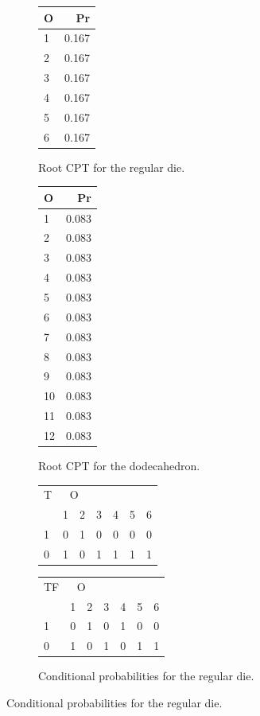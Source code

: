 \documentclass[
  10pt,
]{scrartcl}
\begin{document}
\begin{figure}[H]
\hspace{0.2cm}\begin{subfigure}[!ht]{0.25\textwidth}

\begin{tabular}{lr}
\toprule
O & Pr\\
\midrule
1 & 0.167\\
2 & 0.167\\
3 & 0.167\\
4 & 0.167\\
5 & 0.167\\
6 & 0.167\\
\bottomrule
\end{tabular}
\caption{Root CPT for the regular die.}
\end{subfigure} 
\hspace{0.2cm} \begin{subfigure}[!ht]{0.25\textwidth}

\begin{tabular}{lr}
\toprule
O & Pr\\
\midrule
1 & 0.083\\
2 & 0.083\\
3 & 0.083\\
4 & 0.083\\
5 & 0.083\\
6 & 0.083\\
7 & 0.083\\
8 & 0.083\\
9 & 0.083\\
10 & 0.083\\
11 & 0.083\\
12 & 0.083\\
\bottomrule
\end{tabular}
\caption{Root CPT for the dodecahedron.}
\end{subfigure}

\begin{subfigure}[!ht]{0.25\textwidth}

\begin{tabular}{lrrrrrr}
\toprule
\multicolumn{1}{c}{T} & \multicolumn{2}{c}{O} \\
  & 1 & 2 & 3 & 4 & 5 & 6\\
\midrule
1 & 0 & 1 & 0 & 0 & 0 & 0\\
0 & 1 & 0 & 1 & 1 & 1 & 1\\
\bottomrule
\end{tabular}


\begin{tabular}{lrrrrrr}
\toprule
\multicolumn{1}{c}{TF} & \multicolumn{2}{c}{O} \\
  & 1 & 2 & 3 & 4 & 5 & 6\\
\midrule
1 & 0 & 1 & 0 & 1 & 0 & 0\\
0 & 1 & 0 & 1 & 0 & 1 & 1\\
\bottomrule
\end{tabular}
\caption{Conditional probabilities for the regular die.}
\end{subfigure} \hfill
{}
\end{figure}
\end{document}
